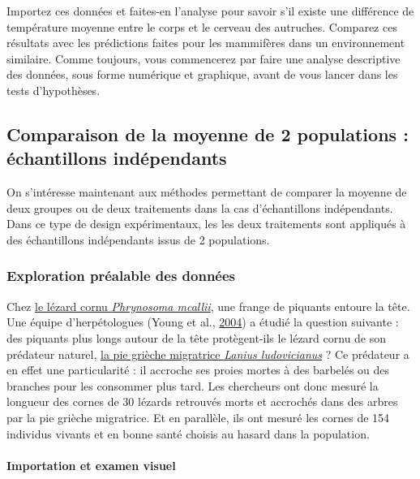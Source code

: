 \documentclass[
  a4paper,
]{article}
\begin{document}
Importez ces données et faites-en l'analyse pour savoir s'il existe une différence de température moyenne entre le corps et le cerveau des autruches. Comparez ces résultats avec les prédictions faites pour les mammifères dans un environnement similaire. Comme toujours, vous commencerez par faire une analyse descriptive des données, sous forme numérique et graphique, avant de vous lancer dans les tests d'hypothèses.

\hypertarget{Indep}{%
\subsection{Comparaison de la moyenne de 2 populations : échantillons indépendants}\label{Indep}}

On s'intéresse maintenant aux méthodes permettant de comparer la moyenne de deux groupes ou de deux traitements dans la cas d'échantillons indépendants. Dans ce type de design expérimentaux, les les deux traitements sont appliqués à des échantillons indépendants issus de 2 populations.

\hypertarget{exploration-pruxe9alable-des-donnuxe9es}{%
\subsubsection{Exploration préalable des données}\label{exploration-pruxe9alable-des-donnuxe9es}}

Chez \href{https://fr.wikipedia.org/wiki/Phrynosoma_mcallii}{le lézard cornu \emph{Phrynosoma mcallii}}, une frange de piquants entoure la tête. Une équipe d'herpétologues (Young et al., \protect\hyperlink{ref-Young2004}{2004}) a étudié la question suivante : des piquants plus longs autour de la tête protègent-ils le lézard cornu de son prédateur naturel, \href{https://fr.wikipedia.org/wiki/Pie-grièche_migratrice}{la pie grièche migratrice \emph{Lanius ludovicianus}} ? Ce prédateur a en effet une particularité : il accroche ses proies mortes à des barbelés ou des branches pour les consommer plus tard. Les chercheurs ont donc mesuré la longueur des cornes de 30 lézards retrouvés morts et accrochés dans des arbres par la pie grièche migratrice. Et en parallèle, ils ont mesuré les cornes de 154 individus vivants et en bonne santé choisis au hasard dans la population.

\hypertarget{importation-et-examen-visuel-2}{%
\paragraph{Importation et examen visuel}\label{importation-et-examen-visuel-2}}
\end{document}
